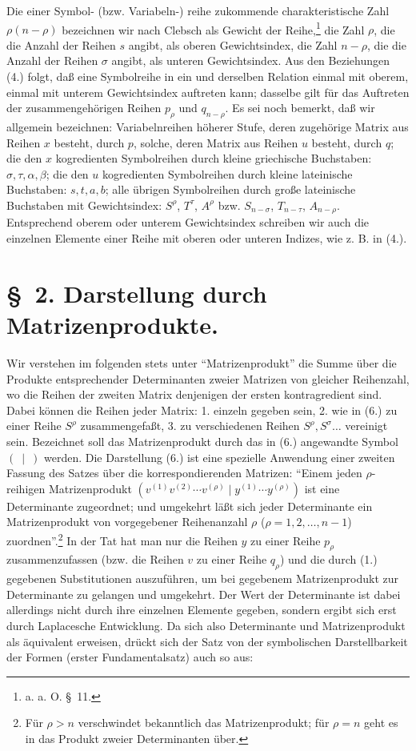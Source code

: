 \documentclass[11pt]{article}
\begin{document}
Die einer Symbol- (bzw. Variabeln-) reihe zukommende charakteristische Zahl $\rho(n-\rho)$ bezeichnen wir nach Clebsch als Gewicht der Reihe,\footnote{a. a. O. \S\ 11.} die Zahl $\rho$, die die Anzahl der Reihen $s$ angibt, als oberen Gewichtsindex, die Zahl $n-\rho$, die die Anzahl der Reihen $\sigma$ angibt, als unteren Gewichtsindex. Aus den Beziehungen (4.) folgt, daß eine Symbolreihe in ein und derselben Relation einmal mit oberem, einmal mit unterem Gewichtsindex auftreten kann; dasselbe gilt für das Auftreten der zusammengehörigen Reihen $p_\rho$ und $q_{n-\rho}$. Es sei noch bemerkt, daß wir allgemein bezeichnen: Variabelnreihen höherer Stufe, deren zugehörige Matrix aus Reihen $x$ besteht, durch $p$, solche, deren Matrix aus Reihen $u$ besteht, durch $q$; die den $x$ kogredienten Symbolreihen durch kleine griechische Buchstaben: $\sigma,\tau,\alpha,\beta$; die den $u$ kogredienten Symbolreihen durch kleine lateinische Buchstaben: $s,t,a,b$; alle übrigen Symbolreihen durch große lateinische Buchstaben mit Gewichtsindex: $S^\rho$, $T^\tau$, $A^\rho$ bzw. $S_{n-\sigma}$, $T_{n-\tau}$, $A_{n-\rho}$. Entsprechend oberem oder unterem Gewichtsindex schreiben wir auch die einzelnen Elemente einer Reihe mit oberen oder unteren Indizes, wie z. B. in (4.).

\section*{\S\ 2. Darstellung durch Matrizenprodukte.}
Wir verstehen im folgenden stets unter ``Matrizenprodukt'' die Summe über die Produkte entsprechender Determinanten zweier Matrizen von gleicher Reihenzahl, wo die Reihen der zweiten Matrix denjenigen der ersten kontragredient sind. Dabei können die Reihen jeder Matrix: 1. einzeln gegeben sein, 2. wie in (6.) zu einer Reihe $S^\rho$ zusammengefaßt, 3. zu verschiedenen Reihen $S^\rho,S^\sigma\ldots$ vereinigt sein. Bezeichnet soll das Matrizenprodukt durch das in (6.) angewandte Symbol $(\ \mid\ )$ werden. Die Darstellung (6.) ist eine spezielle Anwendung einer zweiten Fassung des Satzes über die korrespondierenden Matrizen: ``Einem jeden $\rho$-reihigen Matrizenprodukt $(v^{(1)}v^{(2)}\cdots v^{(\rho)}\mid y^{(1)}\cdots y^{(\rho)})$ ist eine Determinante zugeordnet; und umgekehrt läßt sich jeder Determinante ein Matrizenprodukt von vorgegebener Reihenanzahl $\rho$ ($\rho=1,2,\ldots,n-1$) zuordnen''.\footnote{Für $\rho>n$ verschwindet bekanntlich das Matrizenprodukt; für $\rho=n$ geht es in das Produkt zweier Determinanten über.} In der Tat hat man nur die Reihen $y$ zu einer Reihe $p_\rho$ zusammenzufassen (bzw. die Reihen $v$ zu einer Reihe $q_\rho$) und die durch (1.) gegebenen Substitutionen auszuführen, um bei gegebenem Matrizenprodukt zur Determinante zu gelangen und umgekehrt. Der Wert der Determinante ist dabei allerdings nicht durch ihre einzelnen Elemente gegeben, sondern ergibt sich erst durch Laplacesche Entwicklung. Da sich also Determinante und Matrizenprodukt als äquivalent erweisen, drückt sich der Satz von der symbolischen Darstellbarkeit der Formen (erster Fundamentalsatz) auch so aus:
\end{document}
